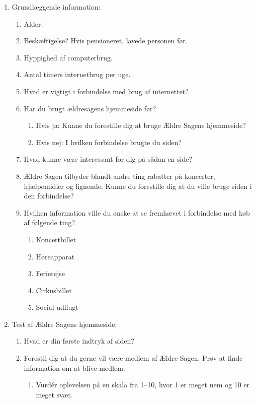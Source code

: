 \begin{enumerate}
    \item Grundlæggende information:
    \begin{enumerate}
        \item Alder.
        \item Beskæftigelse? Hvis pensioneret, lavede personen før.
        \item Hyppighed af computerbrug.
        \item Antal timers internetbrug per uge.
        \item Hvad er vigtigt i forbindelse med brug af internettet?
        \item Har du brugt ældresagens hjemmeside før?
        \begin{enumerate}
            \item Hvis ja: Kunne du forestille dig at bruge Ældre Sagens hjemmeside?
            \item Hvis nej: I hvilken forbindelse brugte du siden?
        \end{enumerate}
        \item Hvad kunne være interessant for dig på sådan en side?
        \item Ældre Sagen tilbyder blandt andre ting rabatter på koncerter, hjælpemidler og lignende. Kunne du forestille dig at du ville bruge siden i den forbindelse?
        \item Hvilken information ville du ønske at se fremhævet i forbindelse med køb af følgende ting?
        \begin{enumerate}
            \item Koncertbillet
            \item Høreapparat
            \item Ferierejse
            \item Cirkusbillet
            \item Social udflugt
        \end{enumerate}
    \end{enumerate}
    \item Test af Ældre Sagens hjemmeside:
    \begin{enumerate}
        \item Hvad er din første indtryk af siden?
        \item Forestil dig at du gerne vil være medlem af Ældre Sagen. Prøv at finde information om at blive medlem.
        \begin{enumerate}
            \item Vurdér oplevelsen på en skala fra 1--10, hvor 1 er meget nem og 10 er meget svær.

\end{enumerate}
\end{enumerate}
\end{enumerate}
